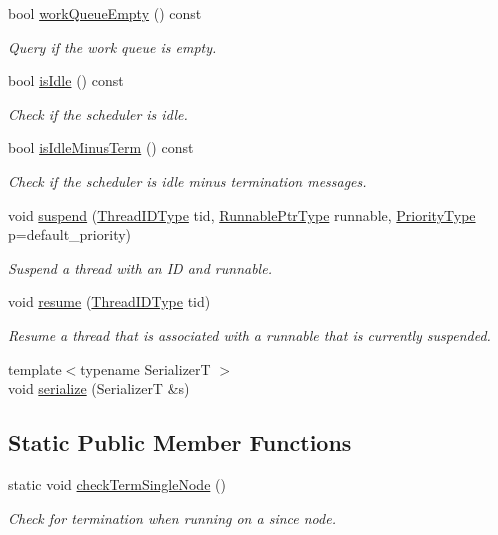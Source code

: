 \begin{DoxyCompactItemize}
bool \hyperlink{structvt_1_1sched_1_1_scheduler_a49bfd7d4a6d187c6c995b84885a1ed19}{work\+Queue\+Empty} () const
\begin{DoxyCompactList}\small\item\em Query if the work queue is empty. \end{DoxyCompactList}\item 
bool \hyperlink{structvt_1_1sched_1_1_scheduler_a047e7a211a220c2729c51c36271c7bf1}{is\+Idle} () const
\begin{DoxyCompactList}\small\item\em Check if the scheduler is idle. \end{DoxyCompactList}\item 
bool \hyperlink{structvt_1_1sched_1_1_scheduler_a3229e007ac15bfb1d337428a52157817}{is\+Idle\+Minus\+Term} () const
\begin{DoxyCompactList}\small\item\em Check if the scheduler is idle minus termination messages. \end{DoxyCompactList}\item 
void \hyperlink{structvt_1_1sched_1_1_scheduler_a9d29a90bbdd1cadd49a4d53415bfdb1a}{suspend} (\hyperlink{namespacevt_a9b887d814dd25ff495a0c8270304ac02}{Thread\+I\+D\+Type} tid, \hyperlink{structvt_1_1sched_1_1_scheduler_a0bc4ead96e12a5c516afebc8b1cb0b79}{Runnable\+Ptr\+Type} runnable, \hyperlink{namespacevt_a86bff9f556eb761b27fc8600d006ac04}{Priority\+Type} p=default\+\_\+priority)
\begin{DoxyCompactList}\small\item\em Suspend a thread with an ID and runnable. \end{DoxyCompactList}\item 
void \hyperlink{structvt_1_1sched_1_1_scheduler_aae177a07ed61e9de5caeab0fefef577a}{resume} (\hyperlink{namespacevt_a9b887d814dd25ff495a0c8270304ac02}{Thread\+I\+D\+Type} tid)
\begin{DoxyCompactList}\small\item\em Resume a thread that is associated with a runnable that is currently suspended. \end{DoxyCompactList}\item 
{\footnotesize template$<$typename SerializerT $>$ }\\void \hyperlink{structvt_1_1sched_1_1_scheduler_ac4221da465bbe5d3acaa56c8c099ef7b}{serialize} (SerializerT \&s)
\end{DoxyCompactItemize}
\subsection*{Static Public Member Functions}
\begin{DoxyCompactItemize}
\item 
static void \hyperlink{structvt_1_1sched_1_1_scheduler_ad1b05fb0d94a3e707d7733ef5206b7c8}{check\+Term\+Single\+Node} ()
\begin{DoxyCompactList}\small\item\em Check for termination when running on a since node. \end{DoxyCompactList}\end{DoxyCompactItemize}
